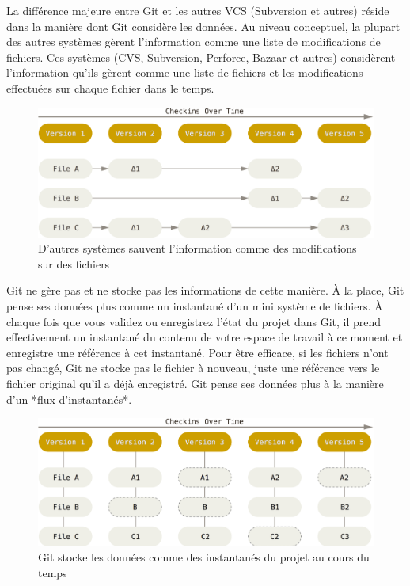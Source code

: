 La différence majeure entre Git et les autres VCS (Subversion et autres) réside dans la manière dont Git considère les données.
Au niveau conceptuel, la plupart des autres systèmes gèrent l'information comme une liste de modifications de fichiers.
Ces systèmes (CVS, Subversion, Perforce, Bazaar et autres) considèrent l'information qu'ils gèrent comme une liste de fichiers et les modifications effectuées sur chaque fichier dans le temps.

\begin{figure}[!h]
  \centering
  \includegraphics{images/deltas}
  \caption{D'autres systèmes sauvent l'information comme des modifications sur des fichiers}
  \label{fig:git:deltas}
\end{figure}

Git ne gère pas et ne stocke pas les informations de cette manière.
À la place, Git pense ses données plus comme un instantané d'un mini système de fichiers.
À chaque fois que vous validez ou enregistrez l'état du projet dans Git, il prend effectivement un instantané du contenu de votre espace de travail à ce moment et enregistre une référence à cet instantané.
Pour être efficace, si les fichiers n'ont pas changé, Git ne stocke pas le fichier à nouveau, juste une référence vers le fichier original qu'il a déjà enregistré.
Git pense ses données plus à la manière d'un *flux d'instantanés*.

\begin{figure}[!h]
  \centering
  \includegraphics{images/snapshots}
  \caption{Git stocke les données comme des instantanés du projet au cours du temps}
  \label{fig:git:snapshots}
\end{figure}


